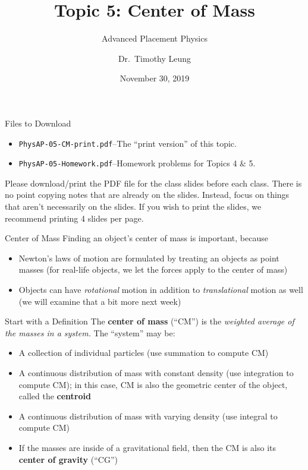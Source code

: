 \documentclass[12pt,compress,aspectratio=169]{beamer}
\title{Topic 5: Center of Mass}
\subtitle{Advanced Placement Physics}
\author[TML]{Dr.\ Timothy Leung}
\institute{Olympiads School, Toronto, ON, Canada}
\date{November 30, 2019}
\begin{document}
\begin{frame}
  \maketitle
\end{frame}



\begin{frame}{Files to Download}
  \begin{itemize}
  \item\texttt{PhysAP-05-CM-print.pdf}--The ``print version'' of this topic.
  \item\texttt{PhysAP-05-Homework.pdf}--Homework problems for Topics 4 \& 5.
  \end{itemize}
  
  \vspace{.1in}Please download/print the PDF file for the class slides before
  each class. There is no point copying notes that are already on the slides.
  Instead, focus on things that aren't necessarily on the slides. If you wish
  to print the slides, we recommend printing 4 slides per page.
\end{frame}



\begin{frame}{Center of Mass}
  Finding an object's center of mass is important, because
  \begin{itemize}
  \item Newton's laws of motion are formulated by treating an objects as point
    masses (for real-life objects, we let the forces apply to the center of
    mass)
  \item Objects can have \emph{rotational} motion in addition to
    \emph{translational} motion as well (we will examine that a bit more
    next week)
  \end{itemize}
\end{frame}



\begin{frame}{Start with a Definition}
  The \textbf{center of mass} (``CM'') is the
  \emph{weighted average of the masses in a system.} The ``system'' may be:
  \begin{itemize}
  \item A collection of individual particles (use summation to compute CM)
  \item A continuous distribution of mass with constant density (use
    integration to compute CM); in this case, CM is also the geometric center
    of the object, called the \textbf{centroid}
  \item A continuous distribution of mass with varying density (use integral to
    compute CM)
  \item If the masses are inside of a gravitational field, then the CM is also
    its \textbf{center of gravity} (``CG'')
  \end{itemize}
\end{frame}
\end{document}

